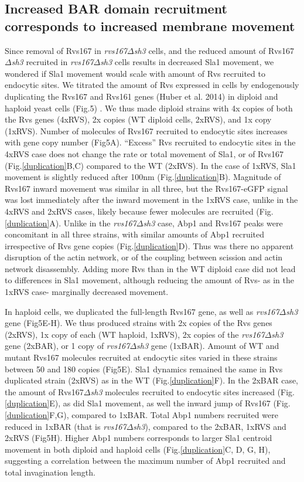 \documentclass[9pt,lineno]{elife}
\begin{document}
\subsection{Increased BAR domain recruitment corresponds to increased membrane movement}
Since removal of Rvs167 in \textit{rvs167$\Delta$sh3}  cells, and the reduced amount of Rvs167\textit{$\Delta$sh3}  recruited in \textit{rvs167$\Delta$sh3} cells results in decreased Sla1 movement, we wondered if Sla1 movement would scale with amount of Rvs recruited to endocytic sites. We titrated the amount of Rvs expressed in cells by endogenously duplicating the Rvs167 and Rvs161 genes (Huber et al. 2014) in diploid and haploid yeast cells (Fig.5) . We thus made diploid strains with 4x copies of both the Rvs genes (4xRVS), 2x copies (WT diploid cells, 2xRVS), and 1x copy (1xRVS). Number of molecules of Rvs167 recruited to endocytic sites increases with gene copy number (Fig5A). “Excess” Rvs recruited to endocytic sites in the 4xRVS case does not change the rate or total movement of Sla1, or of Rvs167 (Fig.\ref{duplication}B,C) compared to the WT (2xRVS). In the case of 1xRVS, Sla1 movement is slightly reduced after 100nm (Fig.\ref{duplication}B). Magnitude of Rvs167 inward movement was similar in all three, but the Rvs167-eGFP signal was lost immediately after the inward movement in the 1xRVS case, unlike in the 4xRVS and 2xRVS cases, likely because fewer molecules are recruited (Fig.\ref{duplication}A). Unlike in the \textit{rvs167$\Delta$sh3}  case, Abp1 and Rvs167 peaks were concomitant in all three strains, with similar amounts of Abp1 recruited irrespective of Rvs gene copies (Fig.\ref{duplication}D). Thus was there no apparent disruption of the actin network, or of the coupling between scission and actin network disassembly. Adding more Rvs than in the WT diploid case did not lead to differences in Sla1 movement, although reducing the amount of Rvs- as in the 1xRVS case- marginally decreased movement. 

In haploid cells, we duplicated the full-length Rvs167 gene, as well as \textit{rvs167$\Delta$sh3} gene (Fig5E-H). We thus produced strains with 2x copies of the Rvs genes (2xRVS), 1x copy of each (WT haploid, 1xRVS), 2x copies of the \textit{rvs167$\Delta$sh3} gene (2xBAR), or 1 copy of \textit{rvs167$\Delta$sh3} gene (1xBAR). Amount of WT and mutant Rvs167 molecules recruited at endocytic sites varied in these strains between 50 and 180 copies (Fig5E). Sla1 dynamics remained the same in Rvs duplicated strain (2xRVS) as in the WT (Fig.\ref{duplication}F). In the 2xBAR case, the amount of Rvs167\textit{$\Delta$sh3}  molecules  recruited to endocytic sites increased (Fig.\ref{duplication}E), as did Sla1 movement, as well the inward jump of Rvs167 (Fig.\ref{duplication}F,G), compared to 1xBAR. Total Abp1 numbers recruited were reduced in 1xBAR (that is \textit{rvs167$\Delta$sh3}), compared to the 2xBAR, 1xRVS and 2xRVS (Fig5H). Higher Abp1 numbers corresponds to larger Sla1 centroid movement in both diploid and haploid cells (Fig.\ref{duplication}C, D, G, H), suggesting a correlation between the maximum number of Abp1 recruited and total invagination length.
\end{document}
